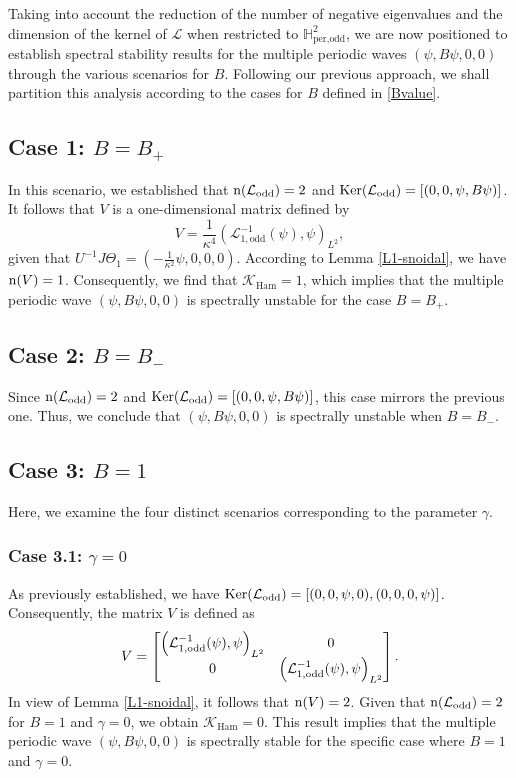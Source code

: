 \documentclass[10pt,reqno,a4paper]{amsart} %
\theoremstyle{definition} %
\numberwithin{equation}{section}
\numberwithin{figure}{section}
\begin{document}
Taking into account the reduction of the number of negative eigenvalues and the dimension of the kernel of $\mathcal{L}$ when restricted to $\mathbb{H}^2_{\text{per,odd}}$, we are now positioned to establish spectral stability results for the multiple periodic waves $(\psi, B\psi, 0, 0)$ through the various scenarios for $B$. Following our previous approach, we shall partition this analysis according to the cases for $B$ defined in \eqref{Bvalue}.

\subsection*{Case 1: $B = B_+$} In this scenario, we established that ${\rm n}(\mathcal{L}_{\text{odd}}) = 2$ and ${\rm Ker}(\mathcal{L}_{\text{odd}}) = [(0,0, \psi, B\psi)]$. It follows that $V$ is a one-dimensional matrix defined by 
\[
V = \frac{1}{\kappa^4} \left( \mathcal{L}_{1,\text{odd}}^{-1} (\psi), \psi \right)_{L^2},
\]
given that $U^{-1} J \Theta_1 = \left( -\frac{1}{\kappa^2} \psi, 0,0,0 \right)$. According to Lemma \ref{L1-snoidal}, we have ${\rm n}(V) = 1$. Consequently, we find that $\mathcal{K}_{\text{Ham}} = 1$, which implies that the multiple periodic wave $(\psi, B\psi, 0, 0)$ is spectrally unstable for the case $B = B_+$.

\subsection*{Case 2: $B = B_-$} Since ${\rm n}(\mathcal{L}_{\text{odd}}) = 2$ and ${\rm Ker}(\mathcal{L}_{\text{odd}}) = [(0,0, \psi, B\psi)]$, this case mirrors the previous one. Thus, we conclude that $(\psi, B\psi, 0, 0)$ is spectrally unstable when $B = B_-$.

\subsection*{Case 3: $B = 1$} Here, we examine the four distinct scenarios corresponding to the parameter $\gamma$.

\subsubsection*{Case 3.1: $\gamma = 0$} As previously established, we have ${\rm Ker}(\mathcal{L}_{\rm odd}) = [(0,0,\psi,0), (0,0,0,\psi)]$. Consequently, the matrix $V$ is defined as
\begin{equation*}
    V = \begin{bmatrix}
        \left( \mathcal{L}_{\rm 1,odd}^{-1} (\psi), \psi \right)_{L^2} & 0 \\
        0 & \left( \mathcal{L}_{\rm 1,odd}^{-1} (\psi), \psi \right)_{L^2}
    \end{bmatrix}.
\end{equation*}
In view of Lemma \ref{L1-snoidal}, it follows that ${\rm n}(V) = 2$. Given that ${\rm n}(\mathcal{L}_{\rm odd}) = 2$ for $B=1$ and $\gamma = 0$, we obtain $\mathcal{K}_{\text{Ham}} = 0$. This result implies that the multiple periodic wave $(\psi, B\psi, 0, 0)$ is spectrally stable for the specific case where $B = 1$ and $\gamma = 0$.
\end{document}
